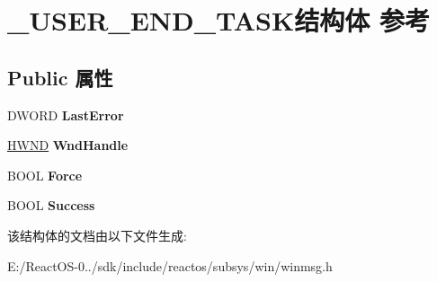 \hypertarget{struct___u_s_e_r___e_n_d___t_a_s_k}{}\section{\+\_\+\+U\+S\+E\+R\+\_\+\+E\+N\+D\+\_\+\+T\+A\+S\+K结构体 参考}
\label{struct___u_s_e_r___e_n_d___t_a_s_k}
\subsection*{Public 属性}
\begin{DoxyCompactItemize}
\item 
\mbox{\label{struct___u_s_e_r___e_n_d___t_a_s_k_a1e1651c6656d7398b48af5d1cf17716e}} 
D\+W\+O\+RD {\bfseries Last\+Error}
\item 
\mbox{\label{struct___u_s_e_r___e_n_d___t_a_s_k_aa86b7460669d221e4f34154ea3e2c5ac}} 
\hyperlink{interfacevoid}{H\+W\+ND} {\bfseries Wnd\+Handle}
\item 
\mbox{\label{struct___u_s_e_r___e_n_d___t_a_s_k_a1c57a2261bb632dd8d66cff08e59cea8}} 
B\+O\+OL {\bfseries Force}
\item 
\mbox{\label{struct___u_s_e_r___e_n_d___t_a_s_k_a460c35fb8568519db18507936304cacc}} 
B\+O\+OL {\bfseries Success}
\end{DoxyCompactItemize}


该结构体的文档由以下文件生成\+:\begin{DoxyCompactItemize}
\item 
E\+:/\+React\+O\+S-\/0../sdk/include/reactos/subsys/win/winmsg.\+h\end{DoxyCompactItemize}

